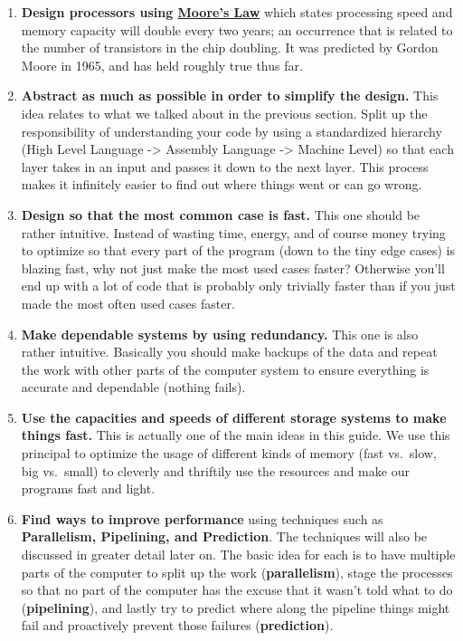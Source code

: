 \documentclass[landscape]{article}
\begin{document}
\begin{multicols}{3}
\begin{enumerate}
\def\labelenumi{\arabic{enumi}.}
\item
  \textbf{Design processors using
  \href{http://wikipedia.org/wiki/Moores_law}{Moore's Law}} which states
  processing speed and memory capacity will double every two years; an
  occurrence that is related to the number of transistors in the chip
  doubling. It was predicted by Gordon Moore in 1965, and has held
  roughly true thus far.
\item
  \textbf{Abstract as much as possible in order to simplify the design.}
  This idea relates to what we talked about in the previous section.
  Split up the responsibility of understanding your code by using a
  standardized hierarchy (High Level Language -\textgreater{} Assembly
  Language -\textgreater{} Machine Level) so that each layer takes in an
  input and passes it down to the next layer. This process makes it
  infinitely easier to find out where things went or can go wrong.
\item
  \textbf{Design so that the most common case is fast.} This one should
  be rather intuitive. Instead of wasting time, energy, and of course
  money trying to optimize so that every part of the program (down to
  the tiny edge cases) is blazing fast, why not just make the most used
  cases faster? Otherwise you'll end up with a lot of code that is
  probably only trivially faster than if you just made the most often
  used cases faster.
\item
  \textbf{Make dependable systems by using redundancy.} This one is also
  rather intuitive. Basically you should make backups of the data and
  repeat the work with other parts of the computer system to ensure
  everything is accurate and dependable (nothing fails).
\item
  \textbf{Use the capacities and speeds of different storage systems to
  make things fast.} This is actually one of the main ideas in this
  guide. We use this principal to optimize the usage of different kinds
  of memory (fast vs.~slow, big vs.~small) to cleverly and thriftily use
  the resources and make our programs fast and light.
\item
  \textbf{Find ways to improve performance} using techniques such as
  \textbf{Parallelism, Pipelining, and Prediction}. The techniques will
  also be discussed in greater detail later on. The basic idea for each
  is to have multiple parts of the computer to split up the work
  (\textbf{parallelism}), stage the processes so that no part of the
  computer has the excuse that it wasn't told what to do
  (\textbf{pipelining}), and lastly try to predict where along the
  pipeline things might fail and proactively prevent those failures
  (\textbf{prediction}).
\end{enumerate}


\end{multicols}
\end{document}
